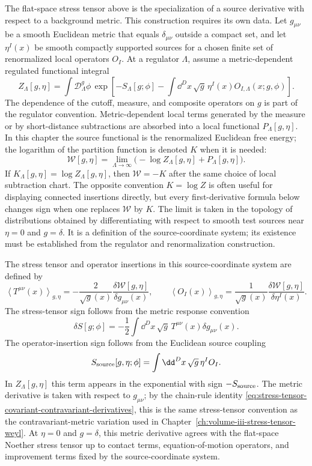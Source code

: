 The flat-space stress tensor above is the specialization of a source derivative
with respect to a background metric.  This construction requires its own data.
Let \(g_{\mu\nu}\) be a smooth Euclidean metric that equals
\(\delta_{\mu\nu}\) outside a compact set, and let \(\eta^I(x)\) be smooth
compactly supported sources for a chosen finite set of renormalized local
operators \(O_I\).  At a regulator \(\Lambda\), assume a metric-dependent
regulated functional integral
\[
  Z_\Lambda[g,\eta]
  =
  \int \mathcal D_\Lambda^g\phi\,
  \exp\left[
    -S_\Lambda[g;\phi]
    -\int\dd^Dx\,\sqrt g\,\eta^I(x)O_{I,\Lambda}(x;g,\phi)
  \right].
\]
The dependence of the cutoff, measure, and composite operators on \(g\) is part
of the regulator convention.  Metric-dependent local terms generated by the
measure or by short-distance subtractions are absorbed into a local functional
\(P_\Lambda[g,\eta]\).  In this chapter the source functional is the
renormalized Euclidean free energy; the logarithm of the partition function is
denoted \(K\) when it is needed:
\[
  \mathcal W[g,\eta]
  =
  \lim_{\Lambda\to\infty}
  \bigl(-\log Z_\Lambda[g,\eta]+P_\Lambda[g,\eta]\bigr).
\]
If \(K_\Lambda[g,\eta]=\log Z_\Lambda[g,\eta]\), then
\(\mathcal W=-K\) after the same choice of local subtraction chart.  The
opposite convention \(K=\log Z\) is often useful for displaying connected
insertions directly, but every first-derivative formula below changes sign when
one replaces \(\mathcal W\) by \(K\).  The limit is taken in the topology of
distributions obtained by differentiating with respect to smooth test sources
near \(\eta=0\) and \(g=\delta\).  It is a definition of the source-coordinate system; its
existence must be established from the regulator and renormalization
construction.

The stress tensor and operator insertions in this source-coordinate system are defined by
\begin{equation}
  \left\langle T^{\mu\nu}(x)\right\rangle_{g,\eta}
  =
  -\frac{2}{\sqrt g(x)}
  \frac{\delta\mathcal W[g,\eta]}{\delta g_{\mu\nu}(x)},
  \qquad
  \left\langle O_I(x)\right\rangle_{g,\eta}
  =
  \frac{1}{\sqrt g(x)}
  \frac{\delta\mathcal W[g,\eta]}{\delta\eta^I(x)} .
  \label{eq:volume-iii-source-derivative-conventions}
\end{equation}
The stress-tensor sign follows from the metric response convention
\[
  \delta S[g;\phi]
  =
  -\frac12\int\dd^D x\,\sqrt g\,
  T^{\mu\nu}(x)\delta g_{\mu\nu}(x).
\]
The operator-insertion sign follows from the Euclidean source coupling
\[
  S_{\rm source}[g,\eta;\phi]
  =
  \int\dd^D x\,\sqrt g\,\eta^I O_I .
\]
In \(Z_\Lambda[g,\eta]\) this term appears in the exponential with sign
\(-S_{\rm source}\).
The metric derivative is taken with respect to \(g_{\mu\nu}\); by the chain-rule
identity \eqref{eq:stress-tensor-covariant-contravariant-derivatives}, this is
the same stress-tensor convention as the contravariant-metric variation used in
Chapter~\ref{ch:volume-iii-stress-tensor-weyl}.
At \(\eta=0\) and \(g=\delta\), this metric derivative agrees with the
flat-space Noether stress tensor up to contact terms, equation-of-motion
operators, and improvement terms fixed by the source-coordinate system.

